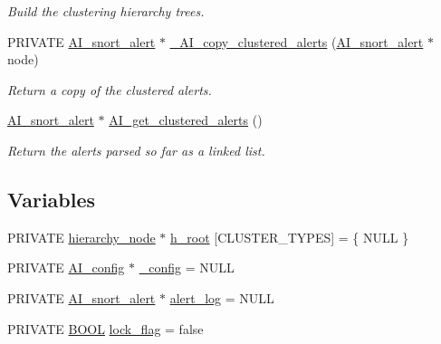 \begin{DoxyCompactItemize}
\begin{DoxyCompactList}\small\item\em Build the clustering hierarchy trees. \item\end{DoxyCompactList}\item 
PRIVATE \hyperlink{struct__AI__snort__alert}{AI\_\-snort\_\-alert} $\ast$ \hyperlink{group__cluster_gab4c8ab92691e85a6f0ac4abb122712fd}{\_\-AI\_\-copy\_\-clustered\_\-alerts} (\hyperlink{struct__AI__snort__alert}{AI\_\-snort\_\-alert} $\ast$node)
\begin{DoxyCompactList}\small\item\em Return a copy of the clustered alerts. \item\end{DoxyCompactList}\item 
\hyperlink{struct__AI__snort__alert}{AI\_\-snort\_\-alert} $\ast$ \hyperlink{group__cluster_ga2553c678eeb83282c230d649a0e8fcd4}{AI\_\-get\_\-clustered\_\-alerts} ()
\begin{DoxyCompactList}\small\item\em Return the alerts parsed so far as a linked list. \item\end{DoxyCompactList}\end{DoxyCompactItemize}
\subsection*{Variables}
\begin{DoxyCompactItemize}
\item 
PRIVATE \hyperlink{struct__hierarchy__node}{hierarchy\_\-node} $\ast$ \hyperlink{group__cluster_ga97d35425cf5a0207fb50b64ee8cdda82}{h\_\-root} \mbox{[}CLUSTER\_\-TYPES\mbox{]} = \{ NULL \}
\item 
PRIVATE \hyperlink{structAI__config}{AI\_\-config} $\ast$ \hyperlink{group__cluster_ga91458e2d34595688e39fcb63ba418849}{\_\-config} = NULL
\item 
PRIVATE \hyperlink{struct__AI__snort__alert}{AI\_\-snort\_\-alert} $\ast$ \hyperlink{group__cluster_gaaf4c19f60f48741b0890c6114dcff7d9}{alert\_\-log} = NULL
\item 
PRIVATE \hyperlink{spp__ai_8h_a3e5b8192e7d9ffaf3542f1210aec18dd}{BOOL} \hyperlink{group__cluster_gafebc81c042a632dc987e113b7f390274}{lock\_\-flag} = false
\end{DoxyCompactItemize}



